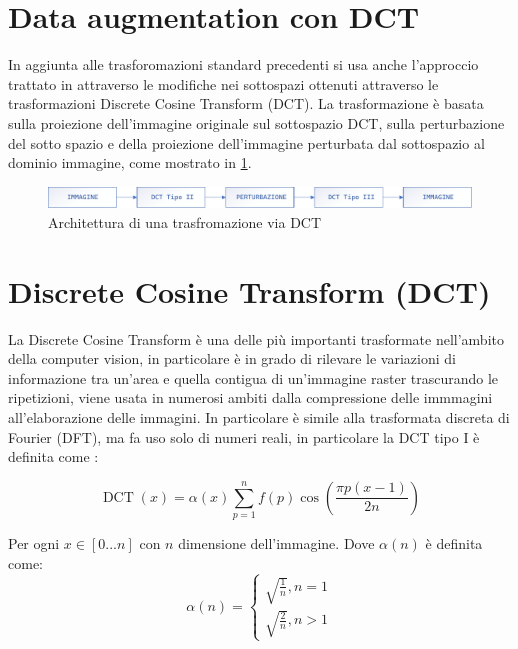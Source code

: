 \section{Data augmentation con DCT}\label{data-augmentation-con-dct}

In aggiunta alle trasforomazioni standard precedenti si usa anche l'approccio trattato in  \cite{nanni_dct_pca} attraverso le modifiche nei sottospazi ottenuti attraverso le trasformazioni Discrete Cosine
Transform (DCT). La trasformazione è basata sulla proiezione dell'immagine originale sul sottospazio DCT, sulla perturbazione del sotto spazio e della proiezione dell'immagine perturbata dal sottospazio al dominio immagine, come mostrato in \cref{fig:dct-schema}.

\begin{figure}[ht]
    \centering
    \includegraphics[width=1\textwidth]{data-augmentation/dct-trasformazione.pdf}
    \caption{Architettura di una trasfromazione via DCT}
    \label{fig:dct-schema}
\end{figure}


\section{Discrete Cosine Transform (DCT)}\label{discrete-cosine-transform-dct}


La Discrete Cosine Transform è una delle più importanti trasformate nell'ambito della computer vision, in particolare è in grado di rilevare le  variazioni di informazione tra un'area e quella contigua di un'immagine raster trascurando le ripetizioni, viene usata in numerosi ambiti dalla compressione delle immmagini all'elaborazione delle immagini. In particolare è simile alla  trasformata discreta di Fourier (DFT), ma fa uso solo di numeri reali, in particolare la DCT tipo I è definita come \cite{syed_dct} \cite{gonzalez_dip}:

\[ \operatorname{DCT}(x)=\alpha(x) \sum_{p=1}^{n} f(p) \cos \left(\frac { \pi p  (x- 1) } { 2 n }\right) \]

Per ogni \(x\in [0...n]\) con \(n\) dimensione dell'immagine. Dove \(\alpha(n)\) è definita come:
\[\alpha(n) = \left\{ \begin{array} { l } \sqrt { \frac { 1 } { n } } , n = 1 \\ \sqrt { \frac { 2 } { n } } , n > 1 \end{array} \right.\]

